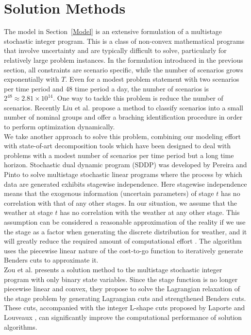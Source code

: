 \documentclass[12pt]{article}
\begin{document}
\section{Solution Methods}
	The model in Section~\ref{Model} is an extensive formulation of a multistage stochastic integer program. This is a class of non-convex mathematical programs that involve uncertainty and are typically difficult to solve, particularly for relatively large problem instances. In the formulation introduced in the previous section, all constraints are scenario specific, while the number of scenarios grows exponentially with \(T\). Even for a modest problem statement with two scenarios per time period and 48 time period a day, the number of scenarios is \(2^{48} \approx 2.81\times 10^{14}\). One way to tackle this problem is reduce the number of scenarios. Recently Liu et al. \cite{liu2008scenario} propose a method to classify scenarios into a small number of nominal groups and offer a braching identification procedure in order to perform optimization dynamically.\\
	\newline
	We take another approach to solve this problem, combining our modeling effort with state-of-art decomposition tools which have been designed to deal with problems with a modest number of scenarios per time period but a long time horizon. Stochastic dual dynamic program (SDDP) was developed by Pereira and Pinto \cite{pereira1991multi} to solve multistage stochastic linear programs where the process by which data are generated exhibits stagewise independence. Here stagewise independence means that the exogenous information (uncertain parameters) of stage \(t\) has no correlation with that of any other stages. In our situation, we assume that the weather at stage \(t\) has no correlation with the weather at any other stage. This assumption can be considered a reasonable approximation of the reality if we use the stage as a factor when generating the discrete distribution for weather, and it will greatly reduce the required amount of computational effort \cite{infanger1996cut}. The algorithm uses the piecewise linear nature of the cost-to-go function to iteratively generate Benders cuts to approximate it.\\
	\newline 
	Zou et al. \cite{zou2016nested} presents a solution method to the multistage stochastic integer program with only binary state variables. Since the stage function is no longer piecewise linear and convex, they propose to solve the Lagrangian relaxation of the stage problem by generating Lagrangian cuts and strengthened Benders cuts. These cuts, accompanied with the integer L-shape cuts proposed by Laporte and Louveaux \cite{laporte1993integer}, can significantly improve the computational performance of solution algorithms.\\
\end{document}
